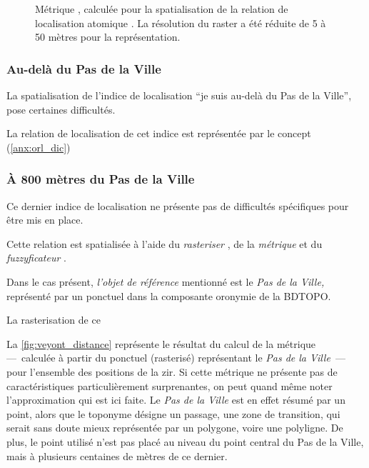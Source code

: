 \begin{figure}
  \centering
  
  \caption{Métrique \protect{}, calculée pour la
    spatialisation de la relation de localisation atomique
    \protect{}. La résolution
    du raster a été réduite de 5 à 50 mètres pour la représentation.}
  \label{fig:veyont_EcartNord}
\end{figure}


\subsubsection{Au-delà du Pas de la Ville}

La spatialisation de l'indice de localisation \enquote{je suis au-delà
  du Pas de la Ville}, pose certaines difficultés.

La relation de localisation de cet indice est représentée par le
concept 
(\autoref{anx:orl_dic})

\subsubsection{À 800 mètres du Pas de la Ville}

Ce dernier indice de localisation ne présente pas de difficultés
spécifiques pour être mis en place.


Cette relation est spatialisée à l'aide du \emph{rasteriser}
, de la \emph{métrique}  et
du \emph{fuzzyficateur} .

Dans le cas présent, \emph{l'objet de référence} mentionné est le
\emph{Pas de la Ville,} représenté par un ponctuel dans la composante
oronymie de la BDTOPO.


La rasterisation de ce



La \autoref{fig:veyont_distance} représente le résultat du calcul de
la métrique  ---~calculée à partir du ponctuel
(rasterisé) représentant le \emph{Pas de la Ville}~--- pour l'ensemble
des positions de la \ac{zir}. Si cette métrique ne présente pas de
caractéristiques particulièrement surprenantes, on peut quand même
noter l'approximation qui est ici faite. Le \emph{Pas de la Ville} est
en effet résumé par un point, alors que le toponyme désigne un
passage, une zone de transition, qui serait sans doute mieux
représentée par un polygone, voire une polyligne. De plus, le point
utilisé n'est pas placé au niveau du point central du Pas de la Ville,
mais à plusieurs centaines de mètres de ce dernier.


